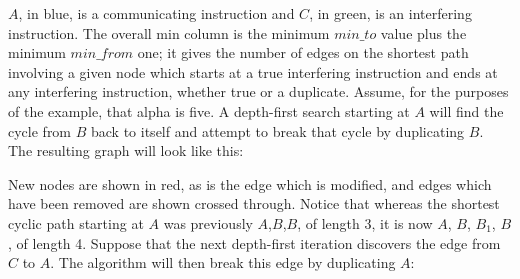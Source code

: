$A$, in blue, is a communicating instruction and $C$, in green, is an
interfering instruction.  The overall min column is the minimum
$\mathit{min\_to}$ value plus the minimum $\mathit{min\_from}$ one; it
gives the number of edges on the shortest path involving a given node
which starts at a true interfering instruction and ends at any
interfering instruction, whether true or a duplicate.  Assume, for the
purposes of the example, that \gls{alpha} is five.  A
depth-first search starting at $A$ will find the cycle from $B$ back
to itself and attempt to break that cycle by duplicating $B$.  The
resulting graph will look like this:


New nodes are shown in red, as is the edge which is modified, and
edges which have been removed are shown crossed through.  Notice that
whereas the shortest cyclic path starting at $A$ was previously
$A$,$B$,$B$, of length 3, it is now $A$, $B$, $B_1$, $B$, of length 4.
Suppose that the next depth-first iteration discovers the edge from
$C$ to $A$.  The algorithm will then break this edge by duplicating
$A$:

